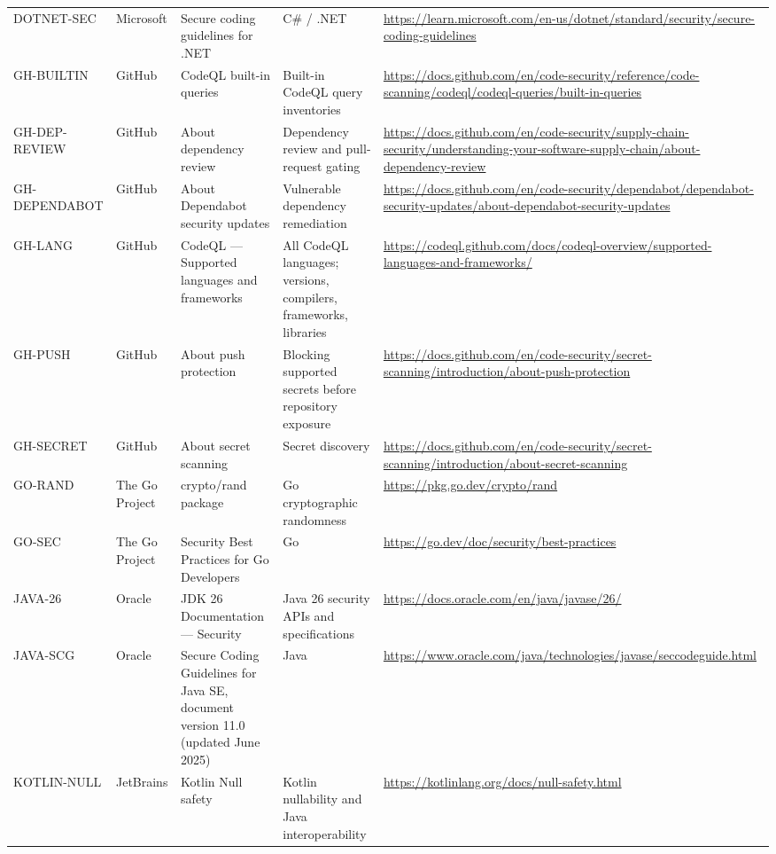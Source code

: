 \documentclass[10pt,letterpaper]{article}
\begin{document}
\begin{landscape}
\begin{longtable}{@{}P{0.82in}P{1.23in}P{2.25in}P{1.7in}P{3.0in}@{}}
DOTNET-SEC & Microsoft & Secure coding guidelines for .NET & C\# / .NET & \url{https://learn.microsoft.com/en-us/dotnet/standard/security/secure-coding-guidelines}\\
GH-BUILTIN & GitHub & CodeQL built-in queries & Built-in CodeQL query inventories & \url{https://docs.github.com/en/code-security/reference/code-scanning/codeql/codeql-queries/built-in-queries}\\
GH-DEP-REVIEW & GitHub & About dependency review & Dependency review and pull-request gating & \url{https://docs.github.com/en/code-security/supply-chain-security/understanding-your-software-supply-chain/about-dependency-review}\\
GH-DEPENDABOT & GitHub & About Dependabot security updates & Vulnerable dependency remediation & \url{https://docs.github.com/en/code-security/dependabot/dependabot-security-updates/about-dependabot-security-updates}\\
GH-LANG & GitHub & CodeQL --- Supported languages and frameworks & All CodeQL languages; versions, compilers, frameworks, libraries & \url{https://codeql.github.com/docs/codeql-overview/supported-languages-and-frameworks/}\\
GH-PUSH & GitHub & About push protection & Blocking supported secrets before repository exposure & \url{https://docs.github.com/en/code-security/secret-scanning/introduction/about-push-protection}\\
GH-SECRET & GitHub & About secret scanning & Secret discovery & \url{https://docs.github.com/en/code-security/secret-scanning/introduction/about-secret-scanning}\\
GO-RAND & The Go Project & crypto/rand package & Go cryptographic randomness & \url{https://pkg.go.dev/crypto/rand}\\
GO-SEC & The Go Project & Security Best Practices for Go Developers & Go & \url{https://go.dev/doc/security/best-practices}\\
JAVA-26 & Oracle & JDK 26 Documentation --- Security & Java 26 security APIs and specifications & \url{https://docs.oracle.com/en/java/javase/26/}\\
JAVA-SCG & Oracle & Secure Coding Guidelines for Java SE, document version 11.0 (updated June 2025) & Java & \url{https://www.oracle.com/java/technologies/javase/seccodeguide.html}\\
KOTLIN-NULL & JetBrains & Kotlin Null safety & Kotlin nullability and Java interoperability & \url{https://kotlinlang.org/docs/null-safety.html}\\

\end{longtable}
\end{landscape}
\end{document}
